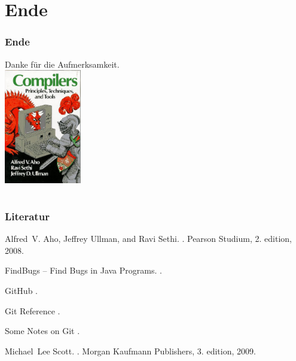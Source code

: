 \documentclass[ucs,9pt]{beamer}
\begin{document}
\section{Ende}
\begin{frame}
  \frametitle{Ende}
  \begin{center}
    \Huge
    Danke für die Aufmerksamkeit.\\[1em]
    \includegraphics[height=5cm]{compilers}
    \ 
  \end{center}
\end{frame}

\appendix
\section*{\appendixname}

\begin{frame}
  \frametitle{Literatur}
    
  \begin{thebibliography}{10}
    
  \beamertemplatebookbibitems

  
    Alfred~V. Aho, Jeffrey Ullman, and Ravi Sethi.
    .
    \newblock Pearson Studium, 2. edition, 2008.


    {F}ind{B}ugs -- {F}ind {B}ugs in {J}ava {P}rograms.
    .
  
    {G}it{H}ub
    .

       {G}it {R}eference
    .

       {S}ome {N}otes on {G}it
    .

      Michael~Lee Scott.
      .
      \newblock Morgan Kaufmann Publishers, 3. edition, 2009.
    
  \end{thebibliography}
\end{frame}
\end{document}

